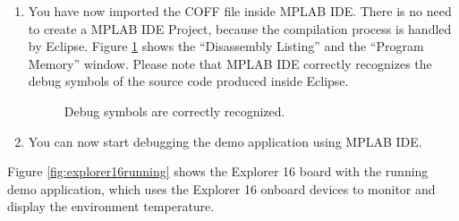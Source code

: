 \begin{enumerate}
\item
  You have now imported the COFF file inside MPLAB IDE. There is no
  need to create a MPLAB IDE Project, because the compilation process
  is handled by Eclipse. Figure \ref{fig:mplab4} shows the
  ``Disassembly Listing'' and the ``Program Memory'' window. Please
  note that MPLAB IDE correctly recognizes the debug symbols of the source
  code produced inside Eclipse.
%
\begin{figure}[htb]
\caption{Debug symbols are correctly recognized.}
\label{fig:mplab4}
\end{figure}

\item
  You can now start debugging the demo application using MPLAB IDE.
\end{enumerate}

Figure \ref{fig:explorer16running} shows the Explorer 16 board with the 
running  demo application, which uses the
Explorer 16 onboard devices to monitor and display the environment temperature.

